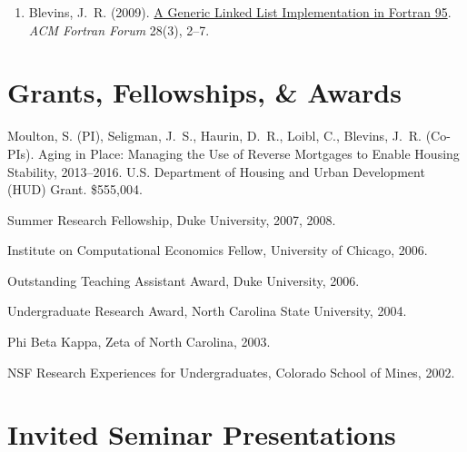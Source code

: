 \documentclass[10pt,letterpaper]{article}
\renewenvironment{itemize}{
  \begin{list}{}{
    \setlength{\leftmargin}{1.5em}
    \setlength{\itemsep}{0.25em}
    \setlength{\parskip}{0pt}
    \setlength{\parsep}{0.25em}
  }
}{
  \end{list}
}
\begin{document}
\begin{enumerate}[resume]
\item Blevins, J.~R. (2009).
  \href{http://jblevins.org/research/generic-list}{A Generic Linked List Implementation in Fortran 95}.
  \textit{ACM Fortran Forum} 28(3), 2--7.
\end{enumerate}

\section*{Grants, Fellowships, \& Awards}

\begin{itemize}
\item Moulton, S. (PI),
Seligman, J.~S., Haurin, D.~R., Loibl, C., Blevins, J.~R. (Co-PIs).
Aging in Place: Managing the Use of Reverse Mortgages to Enable Housing Stability,
2013--2016.
U.S. Department of Housing and Urban Development (HUD) Grant.
\$555,004.
\item Summer Research Fellowship, Duke University, 2007, 2008.
\item Institute on Computational Economics Fellow, University of Chicago, 2006.
\item Outstanding Teaching Assistant Award, Duke University, 2006.
\item Undergraduate Research Award, North Carolina State University, 2004.
\item Phi Beta Kappa, Zeta of North Carolina, 2003.
\item NSF Research Experiences for Undergraduates, Colorado School of Mines, 2002.
\end{itemize}

\section*{Invited Seminar Presentations}
\end{document}
